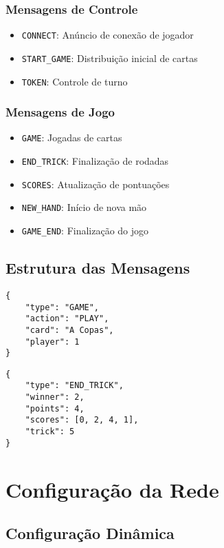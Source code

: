 \documentclass[12pt,a4paper]{article}
\begin{document}
\subsubsection{Mensagens de Controle}
\begin{itemize}
    \item \texttt{CONNECT}: Anúncio de conexão de jogador
    \item \texttt{START\_GAME}: Distribuição inicial de cartas
    \item \texttt{TOKEN}: Controle de turno
\end{itemize}

\subsubsection{Mensagens de Jogo}
\begin{itemize}
    \item \texttt{GAME}: Jogadas de cartas
    \item \texttt{END\_TRICK}: Finalização de rodadas
    \item \texttt{SCORES}: Atualização de pontuações
    \item \texttt{NEW\_HAND}: Início de nova mão
    \item \texttt{GAME\_END}: Finalização do jogo
\end{itemize}

\subsection{Estrutura das Mensagens}

\begin{lstlisting}[caption=Exemplo de Mensagem de Jogada]
{
    "type": "GAME",
    "action": "PLAY",
    "card": "A Copas",
    "player": 1
}
\end{lstlisting}

\begin{lstlisting}[caption=Exemplo de Mensagem de Fim de Rodada]
{
    "type": "END_TRICK",
    "winner": 2,
    "points": 4,
    "scores": [0, 2, 4, 1],
    "trick": 5
}
\end{lstlisting}

\section{Configuração da Rede}

\subsection{Configuração Dinâmica}
\end{document}
